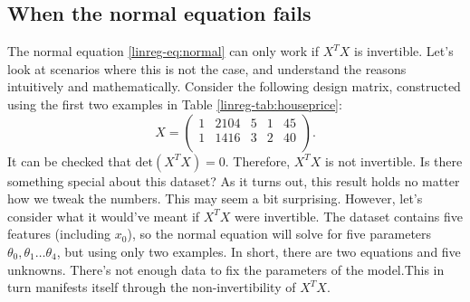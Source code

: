 \documentclass{article}
\theoremstyle{definition}
\begin{document}
\subsection{When the normal equation fails}
The normal equation \eqref{linreg-eq:normal} can only work if $X^TX$ is invertible. Let's look at scenarios where this is not the case, and understand the reasons intuitively and mathematically. Consider the following design matrix, constructed using the first two examples in Table \ref{linreg-tab:houseprice}:
\begin{equation}
    X =
    \begin{pmatrix}
        1 & 2104 & 5 & 1 & 45 \\
        1 & 1416 & 3 & 2 & 40 \\
    \end{pmatrix}.
    \label{linreg-eq:design-mat-noninvert}
\end{equation}
It can be checked that $\text{det}(X^TX)=0$. Therefore, $X^TX$ is not invertible. Is there something special about this dataset? As it turns out, this result holds no matter how we tweak the numbers. This may seem a bit surprising. However, let's consider what it would've meant if $X^TX$ were invertible. The dataset contains five features (including $x_0$), so the normal equation will solve for five parameters $\theta_0,\theta_1\dots\theta_4$, but using only two examples. In short, there are two equations and five unknowns. There's not enough data to fix the parameters of the model.This in turn manifests itself through the non-invertibility of $X^TX$.
\end{document}
